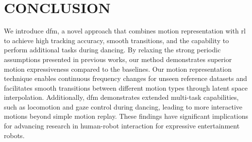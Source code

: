 \section{CONCLUSION}
We introduce \ac{dfm}, a novel approach that combines motion representation with \ac{rl} to achieve high tracking accuracy, smooth transitions, and the capability to perform additional tasks during dancing.
By relaxing the strong periodic assumptions presented in previous works, our method demonstrates superior motion expressiveness compared to the baselines.
Our motion representation technique enables continuous frequency changes for unseen reference datasets and facilitates smooth transitions between different motion types through latent space interpolation.
Additionally, \ac{dfm} demonstrates extended multi-task capabilities, such as locomotion and gaze control during dancing, leading to more interactive motions beyond simple motion replay.
These findings have significant implications for advancing research in human-robot interaction for expressive entertainment robots.



